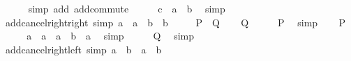 \begin{isabellebody}
\ \ \ \ \isamarkupfalse%
\ {\isacharparenleft}{\kern0pt}simp\ add{\isacharcolon}{\kern0pt}\ add{\isachardot}{\kern0pt}commute{\isacharparenright}{\kern0pt}\isanewline
\ \ \isamarkupfalse%
\ \isamarkupfalse%
\ {\isachardoublequoteopen}c\ {\isacharequal}{\kern0pt}\ a\ {\isacharminus}{\kern0pt}\ b{\isachardoublequoteclose}\ \isamarkupfalse%
\ simp\isanewline
{}\isamarkupfalse%
%
\endisatagproof
{\isafoldproof}%
%
\isadelimproof
\isanewline
%
\endisadelimproof
\isanewline
{}\isamarkupfalse%
\ add{\isacharunderscore}{\kern0pt}cancel{\isacharunderscore}{\kern0pt}right{\isacharunderscore}{\kern0pt}right\ {\isacharbrackleft}{\kern0pt}simp{\isacharbrackright}{\kern0pt}{\isacharcolon}{\kern0pt}\ {\isachardoublequoteopen}a\ {\isacharequal}{\kern0pt}\ a\ {\isacharplus}{\kern0pt}\ b\ {\isasymlongleftrightarrow}\ b\ {\isacharequal}{\kern0pt}\ {}{\isachardoublequoteclose}\isanewline
\ \ {\isacharparenleft}{\kern0pt}\ {\isachardoublequoteopen}{\isacharquery}{\kern0pt}P\ {\isasymlongleftrightarrow}\ {\isacharquery}{\kern0pt}Q{\isachardoublequoteclose}{\isacharparenright}{\kern0pt}\isanewline
%
\isadelimproof
%
\endisadelimproof
%
\isatagproof
{}\isamarkupfalse%
\isanewline
\ \ \isamarkupfalse%
\ {\isacharquery}{\kern0pt}Q\isanewline
\ \ \isamarkupfalse%
\ \isamarkupfalse%
\ {\isacharquery}{\kern0pt}P\ \isamarkupfalse%
\ simp\isanewline
{}\isamarkupfalse%
\isanewline
\ \ \isamarkupfalse%
\ {\isacharquery}{\kern0pt}P\isanewline
\ \ \isamarkupfalse%
\ \isamarkupfalse%
\ {\isachardoublequoteopen}a\ {\isacharminus}{\kern0pt}\ a\ {\isacharequal}{\kern0pt}\ a\ {\isacharplus}{\kern0pt}\ b\ {\isacharminus}{\kern0pt}\ a{\isachardoublequoteclose}\ \isamarkupfalse%
\ simp\isanewline
\ \ \isamarkupfalse%
\ \isamarkupfalse%
\ {\isacharquery}{\kern0pt}Q\ \isamarkupfalse%
\ simp\isanewline
{}\isamarkupfalse%
%
\endisatagproof
{\isafoldproof}%
%
\isadelimproof
\isanewline
%
\endisadelimproof
\isanewline
{}\isamarkupfalse%
\ add{\isacharunderscore}{\kern0pt}cancel{\isacharunderscore}{\kern0pt}right{\isacharunderscore}{\kern0pt}left\ {\isacharbrackleft}{\kern0pt}simp{\isacharbrackright}{\kern0pt}{\isacharcolon}{\kern0pt}\ {\isachardoublequoteopen}a\ {\isacharequal}{\kern0pt}\ b\ {\isacharplus}{\kern0pt}\ a\ {\isasymlongleftrightarrow}\ b\ {\isacharequal}{\kern0pt}\ {}{\isachardoublequoteclose}\isanewline

\end{isabellebody}
